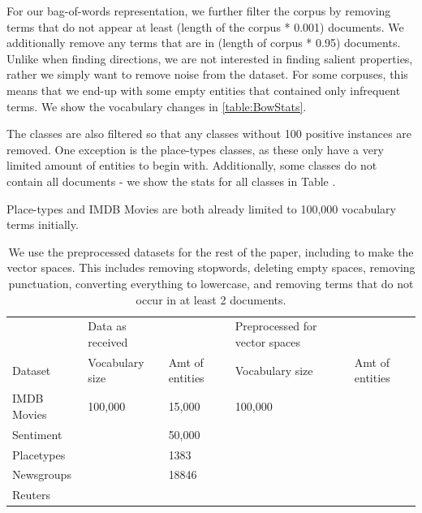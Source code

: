 For our bag-of-words representation, we further filter the corpus by removing terms that do not appear at least (length of the corpus * 0.001) documents. We additionally remove any terms that are in (length of corpus * 0.95) documents. Unlike when finding directions, we are not interested in finding salient properties, rather we simply want to remove noise from the dataset. For some corpuses, this means that we end-up with some empty entities that contained only infrequent terms. We show the vocabulary changes in \ref{table:BowStats}.

The classes are also filtered so that any classes without 100 positive instances are removed. One exception is the place-types classes, as these only have a very limited amount of entities to begin with. Additionally, some classes do not contain all documents - we show the stats for all classes in Table \label{table:ClassStats}.

Place-types and IMDB Movies are both already limited to 100,000 vocabulary terms initially.

\begin{table}[]
	\begin{tabular}{lllll}
		& Data as received &                 & Preprocessed for vector spaces &                 \\
		Dataset     & Vocabulary size  & Amt of entities & Vocabulary size                & Amt of entities \\
		IMDB Movies & 100,000          & 15,000          & 100,000                        &                 \\
		Sentiment   &                  & 50,000          &                                &                 \\
		Placetypes  &                  & 1383            &                                &                 \\
		Newsgroups  &                  & 18846           &                                &                 \\
		Reuters     &                  &                 &                                &                
	\end{tabular}
	\caption{We use the preprocessed datasets for the rest of the paper, including to make the vector spaces. This includes removing stopwords, deleting empty spaces, removing punctuation, converting everything to lowercase, and removing terms that do not occur in at least 2 documents.}  
	\label{table:DatasetStats}
\end{table}

